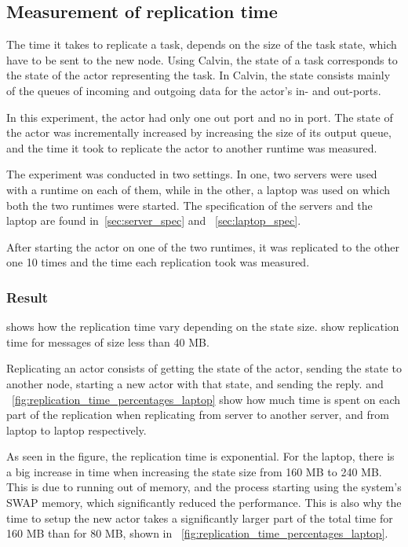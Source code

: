 \documentclass{cslthse-msc}
\begin{document}
\subsection{Measurement of replication time} \label{sec:eval_repl_time}
The time it takes to replicate a task, depends on the size of the task state, which have to be sent to the new node. Using Calvin, the state of a task corresponds to the state of the actor representing the task. In Calvin, the state consists mainly of the queues of incoming and outgoing data for the actor's in- and out-ports.

In this experiment, the actor had only one out port and no in port. The state of the actor was incrementally increased by increasing the size of its output queue, and the time it took to replicate the actor to another runtime was measured.

The experiment was conducted in two settings. In one, two servers were used with a runtime on each of them, while in the other, a laptop was used on which both the two runtimes were started. The specification of the servers and the laptop are found in~\cref{sec:server_spec} and ~\cref{sec:laptop_spec}.

After starting the actor on one of the two runtimes, it was replicated to the other one 10 times and the time each replication took was measured. 

\subsubsection*{Result}
 shows how the replication time vary depending on the state size.  show replication time for messages of size less than 40 MB. 

Replicating an actor consists of getting the state of the actor, sending the state to another node, starting a new actor with that state, and sending the reply.  and ~\cref{fig:replication_time_percentages_laptop} show how much time is spent on each part of the replication when replicating from server to another server, and from laptop to laptop respectively.

As seen in the figure, the replication time is exponential. For the laptop, there is a big increase in time when increasing the state size from 160 MB to 240 MB. This is due to running out of memory, and the process starting using the system's SWAP memory, which significantly reduced the performance. This is also why the time to setup the new actor takes a significantly larger part of the total time for 160 MB than for 80 MB, shown in ~\cref{fig:replication_time_percentages_laptop}.
\end{document}

